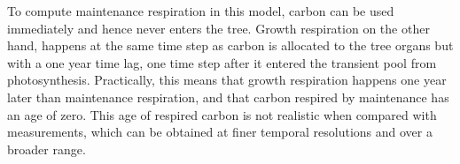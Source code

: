 \documentclass[12pt, a4paper]{article}
\begin{document}
To compute maintenance respiration in this model, carbon can be used immediately and hence never enters the tree. Growth respiration on the other hand, happens at the same time step as carbon is allocated to the tree organs but with a one year time lag, one time step after it entered the transient pool from photosynthesis.
Practically, this means that growth respiration happens one year later than maintenance respiration, and that carbon respired by maintenance has an age of zero. 
This age of respired carbon is not realistic when compared with measurements, which can be obtained at finer temporal resolutions and over a broader range. 



\end{document}
